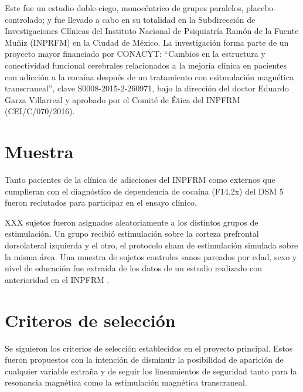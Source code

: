 Este fue un estudio doble-ciego, monocéntrico de grupos paralelos, placebo-controlado; y fue llevado a cabo en su totalidad en la Subdirección de Investigaciones Clínicas del Instituto Nacional de Psiquiatría Ramón de la Fuente Muñiz (INPRFM) en la Ciudad de México.
La investigación forma parte de un proyceto mayor financiado por CONACYT:
``Cambios en la estructura y conectividad funcional cerebrales relacionados a la mejoría clínica en pacientes con adicción a la cocaína después de un tratamiento con esitmulación magnética transcraneal'',
clave S0008-2015-2-260971, bajo la dirección del doctor Eduardo Garza Villarreal y aprobado por el Comité de Ética del INPFRM (CEI/C/070/2016).

\section{Muestra}
Tanto pacientes de la clínica de adicciones del INPFRM como externos que cumplieran con el diagnóstico de dependencia de cocaína (F14.2x) del DSM 5 \parencite{APA2015} fueron reclutados para participar en el ensayo clínico.\par
XXX sujetos fueron asignados aleatoriamente a los distintos grupos de estimulación.
Un grupo recibió estimulación sobre la corteza prefrontal dorsolateral izquierda y el otro, el protocolo sham de estimulación simulada sobre la misma área.
Una muestra de sujetos controles sanos pareados por edad, sexo y nivel de educación fue extraída de los datos de un estudio realizado con anterioridad en el INPFRM \parencite{Garza2017}.

\section{Criteros de selección}
Se siguieron los criterios de selección establecidos en el proyecto principal.
Estos fueron propuestos con la intención de disminuir la posibilidad de aparición de cualquier variable extraña y de seguir los lineamientos de seguridad tanto para la resonancia magnética como la estimulación magnética transcraneal.

